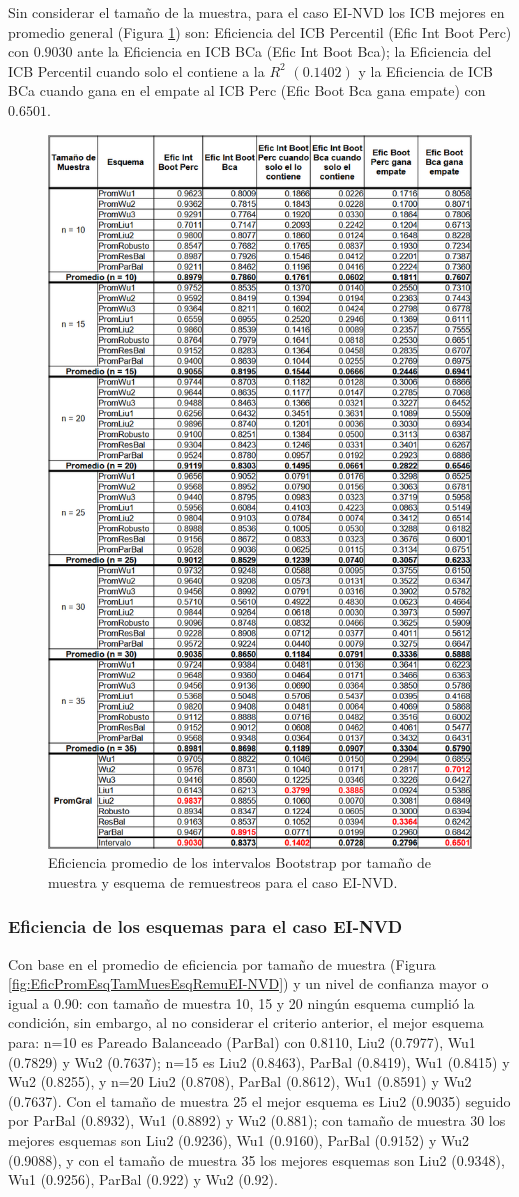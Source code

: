 Sin considerar el tamaño de la muestra, para el caso EI-NVD los ICB mejores en promedio general  (Figura \ref{fig:EficPromIntBootsTamMuestEsqRemuEI-NVD}) son: Eficiencia del ICB Percentil (Efic Int Boot Perc) con $0.9030$ ante la Eficiencia en ICB BCa (Efic Int Boot Bca); la Eficiencia del ICB Percentil cuando solo el contiene a la $R^{2}$ $(0.1402)$ y la Eficiencia de ICB BCa cuando gana en el empate al ICB Perc (Efic Boot Bca gana empate) con $0.6501$.


\begin{figure}[ht] 
	\centering 
	\includegraphics[width=0.55\linewidth]{img/EI_NVD_Efic_Boots.png} 
	\caption{Eficiencia promedio de los intervalos Bootstrap por tamaño de muestra y esquema de remuestreos para el caso EI-NVD.} 
	\label{fig:EficPromIntBootsTamMuestEsqRemuEI-NVD}
\end{figure}
\FloatBarrier



\subsubsection{Eficiencia de los esquemas para el caso EI-NVD}
Con base en el promedio de eficiencia por tamaño de muestra (Figura \ref{fig:EficPromEsqTamMuesEsqRemuEI-NVD}) y un nivel de confianza mayor o igual a 0.90: con tamaño de muestra 10, 15 y 20 ningún esquema cumplió la condición,
sin embargo, al no considerar el criterio anterior, el mejor esquema para: n=10 es Pareado Balanceado (ParBal) con 0.8110, Liu2 (0.7977), Wu1 (0.7829) y Wu2 (0.7637); n=15 es Liu2 (0.8463), ParBal (0.8419), Wu1 (0.8415) y Wu2 (0.8255), y n=20 Liu2 (0.8708), ParBal (0.8612), Wu1 (0.8591) y Wu2 (0.7637). Con el tamaño de muestra 25 el mejor esquema es Liu2 (0.9035) seguido por ParBal (0.8932), Wu1 (0.8892) y Wu2 (0.881); con tamaño de muestra 30 los mejores esquemas son Liu2 (0.9236),  Wu1 (0.9160), ParBal (0.9152) y Wu2 (0.9088), y con el tamaño de muestra 35 los mejores esquemas son Liu2 (0.9348),  Wu1 (0.9256), ParBal (0.922) y Wu2 (0.92).
\vspace{.5cm}

